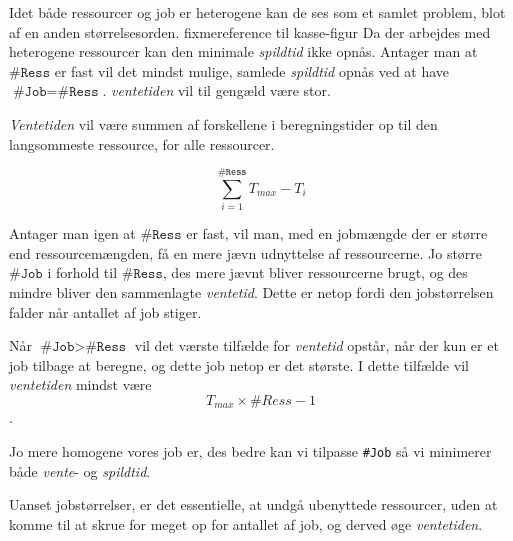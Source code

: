 \documentclass[draft,a4paper,11pt]{article}
\begin{document}
Idet både ressourcer og job er heterogene kan de ses som et samlet problem, blot af en anden størrelsesorden. fixme{reference til kasse-figur}
Da der arbejdes med heterogene ressourcer kan den minimale \emph{spildtid} ikke opnås. 
Antager man at $\texttt{\#Ress}$ er fast vil det mindst mulige, samlede \emph{spildtid} opnås ved at have $\texttt{\#Job} = \texttt{\#Ress}$. \emph{ventetiden} vil til gengæld være stor. 

\emph{Ventetiden} vil være summen af forskellene i beregningstider op til den langsommeste ressource, for alle ressourcer.   
 
\begin{displaymath}
	\sum_{i=1}^{\texttt{\#Ress}} T_{max} - T_{i} 
\end{displaymath}

Antager man igen at $\texttt{\#Ress}$ er fast, vil man, med en jobmængde der er større end ressourcemængden, få en mere jævn udnyttelse af ressourcerne. Jo større $\texttt{\#Job}$ i forhold til $\texttt{\#Ress}$, des mere jævnt bliver ressourcerne brugt, og des mindre bliver den sammenlagte \emph{ventetid}. Dette er netop fordi den jobstørrelsen falder når antallet af job stiger. 

Når $\texttt{\#Job} > \texttt{\#Ress}$ vil det værste tilfælde for \emph{ventetid} opstår, når der kun er et job tilbage at beregne, og dette job netop er det største. I dette tilfælde vil \emph{ventetiden} mindst være 
\[
T_{max} \times \#Ress -1
\]
.



Jo mere homogene vores job er, des bedre kan vi tilpasse \texttt{\#Job} så vi minimerer både \emph{vente}- og \emph{spildtid}. 

Uanset jobstørrelser, er det essentielle, at undgå ubenyttede ressourcer, uden at komme til at skrue for meget op for antallet af job, og derved øge \emph{ventetiden}.


\end{document}
